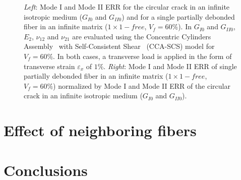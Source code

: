 \documentclass[review]{elsarticle}
\begin{document}
\begin{figure}[!h]
\caption{\textit{Left}: Mode I and Mode II ERR for the circular crack in an infinite isotropic medium ($G_{I0}$ and $G_{II0}$) and for a single partially debonded fiber in an infinite matrix ($1\times 1-free$, $V_{f}=60\%$). In $G_{I0}$ and $G_{II0}$, $E_{2}$, $\nu_{12}$ and $\nu_{21}$ are evaluated using the Concentric Cylinders Assembly~\cite{Hashin1983} with Self-Consistent Shear~\cite{Christensen1979} (CCA-SCS) model for $V_{f}=60\%$. In both cases, a transverse load is applied in the form of transverse strain $\varepsilon_{x}$ of $1\%$. \textit{Right}: Mode I and Mode II ERR of single partially debonded fiber in an infinite matrix ($1\times 1-free$, $V_{f}=60\%$) normalized by Mode I and Mode II ERR of the circular crack in an infinite isotropic medium ($G_{I0}$ and $G_{II0}$).}\label{fig:comparescalingVf60}
\end{figure}
\section{Effect of neighboring fibers}






\section{Conclusions}
\end{document}
